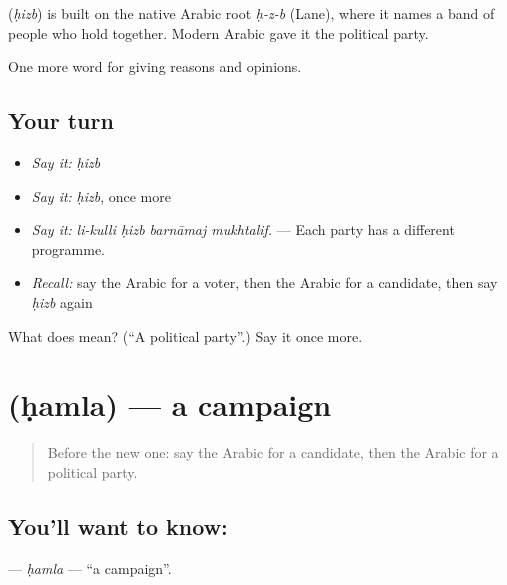 \begin{cousinweb}
\textbf{} (\emph{ḥizb}) is built on the native Arabic root \emph{ḥ-z-b} (Lane), where it names a band of people who hold together. Modern Arabic gave it the political party.
\end{cousinweb}

\begin{grammarlens}[title={What you've built}]
One more word for giving reasons and opinions.
\end{grammarlens}

\subsection*{Your turn}
\begin{itemize}
\raggedright
  \item \emph{Say it:} \emph{ḥizb}
  \item \emph{Say it:} \emph{ḥizb}, once more
  \item \emph{Say it:} \emph{li-kulli ḥizb barnāmaj mukhtalif.} — Each party has a different programme.
  \item \emph{Recall:} say the Arabic for a voter, then the Arabic for a candidate, then say \emph{ḥizb} again
\end{itemize}

\begin{tcolorbox}[breakable,colback=teal!4,colframe=teal!35!black,title={Before you move on}]
What does  mean? (\textquotedblleft{}A political party\textquotedblright{}.) Say it once more.
\end{tcolorbox}
\section[\texorpdfstring{\ar{حملة} (ḥamla)}{حملة (ḥamla)}]{ (ḥamla) — a campaign}

\label{lesson:AR-C379-hamla}



\begin{quote}
Before the new one: say the Arabic for a candidate, then the Arabic for a political party.
\end{quote}

\subsection*{You'll want to know: }
\textbf{} — \emph{ḥamla} — \textquotedblleft{}a campaign\textquotedblright{}.

